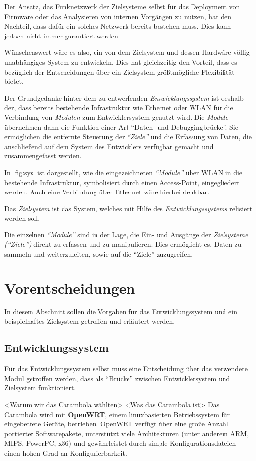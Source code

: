 Der Ansatz, das Funknetzwerk der Zielsysteme selbst für das Deployment von
Firmware oder das Analysieren von internen Vorgängen zu nutzen, hat den
Nachteil, dass dafür ein solches Netzwerk bereits bestehen muss.
Dies kann jedoch nicht immer garantiert werden.

Wünschenswert wäre es also, ein von dem Zielsystem und dessen Hardwäre völlig
unabhängiges System zu entwickeln. Dies hat gleichzeitig den Vorteil, dass es
bezüglich der Entscheidungen über ein Zielsystem größtmögliche Flexibilität
bietet.

Der Grundgedanke hinter dem zu entwerfenden \emph{Entwicklungssystem} ist
deshalb der, dass bereits bestehende Infrastruktur wie Ethernet oder WLAN für
die Verbindung von \emph{Modulen} zum Entwicklersystem genutzt wird. Die
\emph{Module} übernehmen dann die Funktion einer Art "`Daten- und
Debuggingbrücke"'. Sie ermöglichen die entfernte Steuerung der \emph{"`Ziele"'}
und die Erfassung von Daten, die anschließend auf dem System des Entwicklers
verfügbar gemacht und zusammengefasst werden.

In \autoref{fig:sys} ist dargestellt, wie die eingezeichneten \emph{"`Module"'}
über WLAN in die bestehende Infrastruktur, symbolisiert durch einen
Access-Point, eingegliedert werden. Auch eine Verbindung über Ethernet wäre
hierbei denkbar.
\begin{definition}[Zielsystem]
Das \emph{Zielsystem} ist das System, welches mit Hilfe des
\emph{Entwicklungssystems} relisiert werden soll.
\end{definition}
Die einzelnen \emph{"`Module"'} sind in der Lage, die Ein- und Ausgänge
der \emph{Zielsysteme ("`Ziele"')} direkt zu erfassen und zu manipulieren. Dies
ermöglicht es, Daten zu sammeln und weiterzuleiten, sowie auf die "`Ziele"'
zuzugreifen.
\section{Vorentscheidungen}
In diesem Abschnitt sollen die Vorgaben für das Entwicklungssystem und ein
beispielhaftes Zielsystem getroffen und erläutert werden.
\subsection{Entwicklungssystem}
Für das Entwicklungssystem selbst muss eine Entscheidung über das
verwendete Modul getroffen werden, dass als "`Brücke"' zwischen Entwicklersystem
und Zielsystem funktioniert.

<Warum wir das Carambola wählten>
<Was das Carambola ist>
Das Carambola wird mit \textbf{OpenWRT}, einem linuxbasierten
Betriebssystem für eingebettete Geräte, betrieben. OpenWRT verfügt über eine große Anzahl
portierter Softwarepakete, unterstützt viele Architekturen (unter anderem ARM,
MIPS, PowerPC, x86) und gewährleistet durch simple Konfigurationsdateien einen
hohen Grad an Konfigurierbarkeit.
